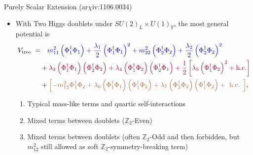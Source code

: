 \documentclass{../bredelebeamer}
\newcommand{\arxiv}{ar$\chi$iv:}
\begin{document}
\begin{frame}{Purely Scalar Extension (\arxiv 1106.0034)}
    \begin{itemize}
        \item With Two Higgs doublets under $SU(2)_L \times U(1)_Y$, the most general potential is
          {\small
            \begin{align}
              V_{\text {tree }}= 
              &\quad \textcolor{blue!60!black}{m_{11}^2\left(\Phi_1^{\dagger} \Phi_1\right) +\frac{\lambda_1}{2}\left(\Phi_1^{\dagger} \Phi_1\right)^2+ m_{22}^2\left(\Phi_2^{\dagger} \Phi_2\right)
              +\frac{\lambda_2}{2}\left(\Phi_2^{\dagger} \Phi_2\right)^2}\\
              & +\textcolor{purple!80!black}{\lambda_3\left(\Phi_1^{\dagger} \Phi_1\right)\left(\Phi_2^{\dagger} \Phi_2\right)+\lambda_4\left(\Phi_1^{\dagger} \Phi_2\right)\left(\Phi_2^{\dagger} \Phi_1\right) + \frac{1}{2}\left[ \lambda_5\left(\Phi_1^{\dagger} \Phi_2\right)^2 + \text{h.c.}\right]}\\
              & +\textcolor{brown!85!black}{\left[ -m_{12}^2\Phi_1^{\dagger} \Phi_2 +\lambda_6\left(\Phi_1^{\dagger} \Phi_1\right)\left(\Phi_1^{\dagger} \Phi_2\right)+\lambda_7\left(\Phi_2^{\dagger} \Phi_2\right)\left(\Phi_1^{\dagger} \Phi_2\right)+\text { h.c. }\right]},
            \end{align}
          }
          \begin{enumerate}
            \item \textcolor{blue!60!black}{Typical mass-like terms and quartic self-interactions}
            \item \textcolor{purple!80!black}{Mixed terms between doublets ($\mathbb{Z}_2$-Even)}
            \item \textcolor{brown!85!black}{Mixed terms between doublets (often $\mathbb{Z}_2$-Odd and then forbidden, but $m_{12}^2$ still allowed as soft $\mathbb{Z}_2$-symmetry-breaking term)}
          \end{enumerate}


\end{itemize}
\end{frame}
\end{document}
